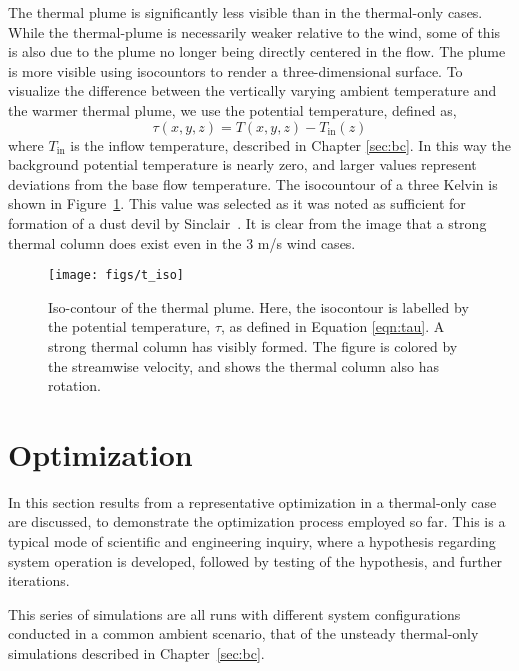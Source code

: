 The thermal plume is significantly less
visible than in the thermal-only cases. While the
thermal-plume is necessarily weaker relative to the wind, some of this
is also due to the plume no longer being directly centered in the
flow. The plume is more visible using isocountors to render a
three-dimensional surface. 
To visualize the difference between the vertically varying ambient
temperature and the warmer thermal plume, we use the potential
temperature, defined as, 
\begin{equation}
  \tau(x,y,z) = T(x,y,z) -T_{\text{in}}(z) 
   \label{eqn:tau}
\end{equation}
where $T_{\text{in}}$ is the inflow temperature, described
in Chapter \ref{sec:bc}. In this way the background potential
temperature is nearly zero, and larger values represent deviations from
the base flow temperature. The isocountour of a three Kelvin is 
shown in Figure~\ref{fig:field_real}. This value was selected as
it was noted as sufficient for formation of a dust devil by
Sinclair~\cite{Sinclair1969}. It is clear from the image that a 
strong thermal column does exist even in the 3 m/s wind cases. 

%
%
  \begin{figure}[!htb]
   \begin{center}
    \texttt{[image: figs/t\_iso]}
    \caption{Iso-contour of the thermal plume. Here, the isocontour is
    labelled by the potential temperature, $\tau$, as defined in
    Equation \ref{eqn:tau}. A strong thermal column has visibly formed. The
    figure is colored by the streamwise velocity, and shows the thermal
    column also has rotation.} 
    \label{fig:field_real}
   \end{center}
  \end{figure}

\section{Optimization}

In this section results from a representative optimization
in a thermal-only case are discussed, to demonstrate the optimization 
process employed so far. This is a typical mode of scientific and
engineering inquiry, where a hypothesis regarding system operation is
developed, followed by testing of the hypothesis, and further
iterations.  

This series of simulations are all runs with different system
configurations conducted in a common ambient scenario, that of the
unsteady thermal-only simulations described in Chapter~\ref{sec:bc}. 

